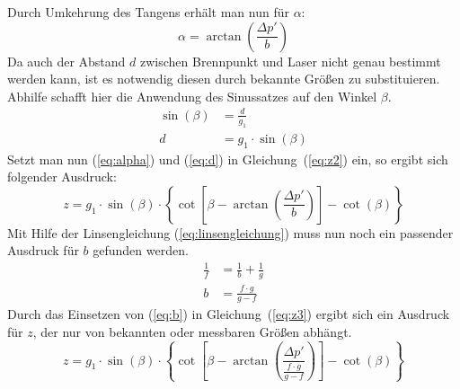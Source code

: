 Durch Umkehrung des Tangens erhält man nun für $\alpha$:
\begin{equation}
	\alpha = \arctan\left(\frac{\Delta p'}{b}\right)
	\label{eq:alpha}
\end{equation}
Da auch der Abstand $d$ zwischen Brennpunkt und Laser nicht genau bestimmt werden kann, ist es notwendig diesen durch bekannte Größen zu substituieren. Abhilfe schafft hier die Anwendung des Sinussatzes auf den Winkel $\beta$.
\begin{align}
	\sin(\beta) &= \frac{d}{g_1}\\
	d &= g_1\cdot\sin(\beta)
	\label{eq:d}
\end{align}
Setzt man nun (\ref{eq:alpha}) und (\ref{eq:d}) in Gleichung~(\ref{eq:z2}) ein, so ergibt sich folgender Ausdruck:
\begin{equation}
	z = g_1\cdot\sin(\beta)\cdot\left\{\cot\left[\beta-\arctan\left(\frac{\Delta p'}{b}\right)\right]-\cot(\beta)\right\}
	\label{eq:z3}
\end{equation}
Mit Hilfe der Linsengleichung (\ref{eq:linsengleichung}) muss nun noch ein passender Ausdruck für $b$ gefunden werden.
\begin{align}
	\frac{1}{f} &= \frac{1}{b} + \frac{1}{g} \label{eq:linsengleichung}\\
	b &= \frac{f\cdot g}{g-f} \label{eq:b}
\end{align}
Durch das Einsetzen von (\ref{eq:b}) in Gleichung~(\ref{eq:z3}) ergibt sich ein Ausdruck für $z$, der nur von bekannten oder messbaren Größen abhängt. 
\begin{equation}
	z = g_1\cdot\sin(\beta)\cdot\left\{\cot\left[\beta-\arctan\left(\frac{\Delta p'}{\frac{f\cdot g}{g-f}}\right)\right]-\cot(\beta)\right\}
	\label{eq:zfinal}
\end{equation}

